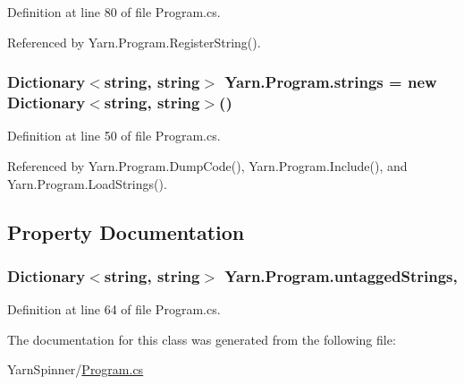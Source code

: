 Definition at line 80 of file Program.\-cs.



Referenced by Yarn.\-Program.\-Register\-String().

\hypertarget{a00138_a59263e00cecfe36d9881b4c30b048f09}{
\subsubsection[{strings}]{\setlength{\rightskip}{0pt plus 5cm}Dictionary$<$string, string$>$ Yarn.\-Program.\-strings = new Dictionary$<$string, string$>$()\hspace{0.3cm}{\ttfamily [package]}}}\label{a00138_a59263e00cecfe36d9881b4c30b048f09}


Definition at line 50 of file Program.\-cs.



Referenced by Yarn.\-Program.\-Dump\-Code(), Yarn.\-Program.\-Include(), and Yarn.\-Program.\-Load\-Strings().



\subsection{Property Documentation}
\hypertarget{a00138_aa8fedbfceaf931d1da3f600eaab6ae87}{
\subsubsection[{untagged\-Strings}]{\setlength{\rightskip}{0pt plus 5cm}Dictionary$<$string, string$>$ Yarn.\-Program.\-untagged\-Strings\hspace{0.3cm}{\ttfamily [get]}, {\ttfamily [package]}}}\label{a00138_aa8fedbfceaf931d1da3f600eaab6ae87}


Definition at line 64 of file Program.\-cs.



The documentation for this class was generated from the following file\-:\begin{DoxyCompactItemize}
\item 
Yarn\-Spinner/\hyperlink{a00289}{Program.\-cs}\end{DoxyCompactItemize}
